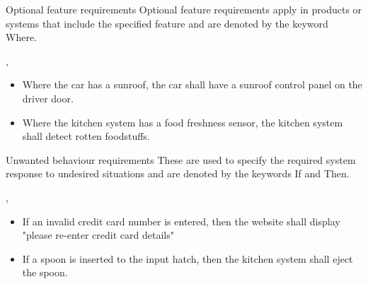 \documentclass[aspectratio=169]{beamer}
\begin{document}


\begin{slide}{Optional feature requirements}
  Optional feature requirements apply in products or systems that include the specified feature and are denoted by the keyword Where.
    \begin{block}{}\centering
      ,
    \end{block}
  
  \begin{example}
  \begin{itemize}
    \item Where the car has a sunroof, the car shall have a sunroof control panel on the driver door.
    \item Where the kitchen system has a food freshness sensor, the kitchen system shall detect rotten foodstuffs. 
  \end{itemize}
  \end{example}
\end{slide}



\begin{slide}{Unwanted behaviour requirements}
    These are used to specify the required system response to undesired situations and are denoted by the keywords If and Then.
    \begin{block}{}\centering
     \eif[<trigger>],
     \ethen
    \end{block}
      
  \begin{example}
  \begin{itemize}
    \item If an invalid credit card number is entered, then the website shall display "please re-enter credit card details"
    \item  If a spoon is inserted to the input hatch, then the kitchen system shall eject the spoon.
  \end{itemize}
  \end{example}
\end{slide}
\end{document}

